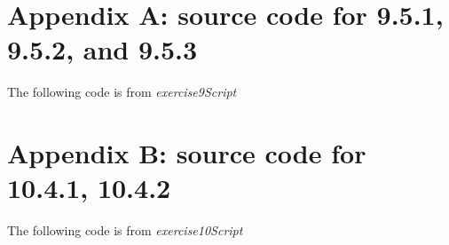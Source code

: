 \documentclass{report}
\begin{document}

\chapter{Appendix A: source code for 9.5.1, 9.5.2, and 9.5.3}


The following code is from \emph{exercise9Script}


\chapter{Appendix B: source code for 10.4.1, 10.4.2}
\label{cha:appendix-b:-source}


The following code is from \emph{exercise10Script}

\end{document}
